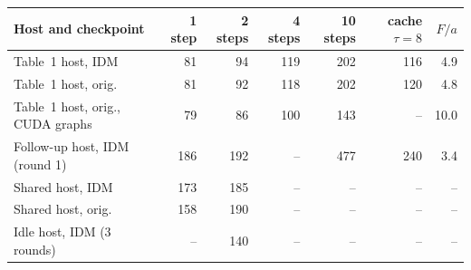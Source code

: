 \begin{tabular}{@{}lrrrrrr@{}}
\toprule
Host and checkpoint & 1 step & 2 steps & 4 steps & 10 steps & cache $\tau{=}8$ & $F/a$ \\
\midrule
Table~1 host, IDM & 81 & 94 & 119 & 202 & 116 & 4.9 \\
Table~1 host, orig. & 81 & 92 & 118 & 202 & 120 & 4.8 \\
Table~1 host, orig., CUDA graphs & 79 & 86 & 100 & 143 & -- & 10.0 \\
Follow-up host, IDM (round 1) & 186 & 192 & -- & 477 & 240 & 3.4 \\
Shared host, IDM & 173 & 185 & -- & -- & -- & -- \\
Shared host, orig. & 158 & 190 & -- & -- & -- & -- \\
Idle host, IDM (3 rounds) & -- & 140 & -- & -- & -- & -- \\
\bottomrule
\end{tabular}
